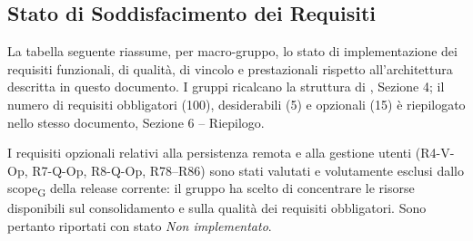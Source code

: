 \subsection{Stato di Soddisfacimento dei Requisiti}
La tabella seguente riassume, per macro-gruppo, lo stato di implementazione dei requisiti funzionali, di qualità, di vincolo e prestazionali rispetto all'architettura descritta in questo documento. I gruppi ricalcano la struttura di , Sezione 4; il numero di requisiti obbligatori (100), desiderabili (5) e opzionali (15) è riepilogato nello stesso documento, Sezione 6 -- Riepilogo.

I requisiti opzionali relativi alla persistenza remota e alla gestione utenti (R4-V-Op, R7-Q-Op, R8-Q-Op, R78--R86) sono stati valutati e volutamente esclusi dallo scope\textsubscript{G} della release corrente: il gruppo ha scelto di concentrare le risorse disponibili sul consolidamento e sulla qualità dei requisiti obbligatori. Sono pertanto riportati con stato \textit{Non implementato}.

